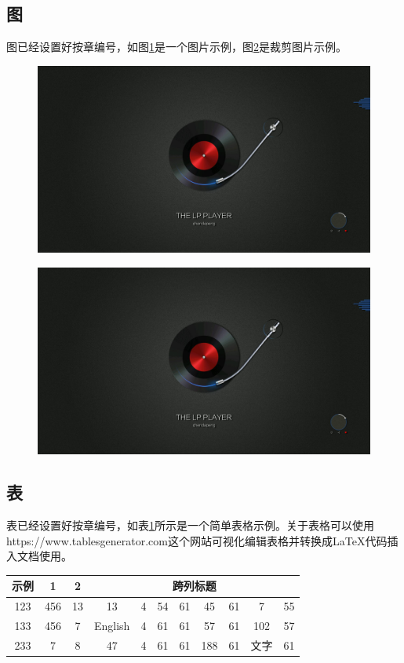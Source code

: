 \documentclass{bucthesis}
\begin{document}
\subsection{图}{\par
	图已经设置好按章编号，如图\ref{fig:music}是一个图片示例，图\ref{fig:musictrim}是裁剪图片示例。\par	
	\begin{figure}[!htbp]
		\centering
		\includegraphics[width=0.8\linewidth]{image/music.jpg}\\
		\label{fig:music}
	\end{figure}
	
	\begin{figure}[!htbp]
		\centering
		\includegraphics[trim=700 200 700 200,clip,scale=0.8,width=0.4\linewidth]{image/music.jpg}\\
		\label{fig:musictrim}
	\end{figure}
}
\subsection{表}{\par
	表已经设置好按章编号，如表\ref{tab:1}所示是一个简单表格示例。关于表格可以使用{https://www.tablesgenerator.com}这个网站可视化编辑表格并转换成\LaTeX{}代码插入文档使用。\par
	\begin{table}[ht]
		\centering
		\renewcommand\arraystretch{1.5}
		\label{tab:1}
		\begin{tabular}{c c c| c c c c c c c c}
			\hline
			示例 & 1  & 2  & \multicolumn{8}{c}{跨列标题}\\
			\hline
			123 & 456 & 13 & 13 & 4 & 54 & 61 & 45 & 61 & 7 & 55\\
			133 & 456 & 7 & English & 4 & 61 & 61 & 57 & 61 & 102 & 57\\
			233 & 7 & 8 & 47 & 4 & 61 & 61 & 188 & 61 & 文字 & 61\\
			\hline
		\end{tabular}
	\end{table}}
\end{document}
